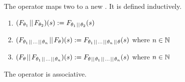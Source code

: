 \documentclass[preview]{standalone}
\begin{document}
%	
\begin{definition}
	The operator \pll maps two \grpfctsN to a new \grpfctN. It is defined inductively.
	\begin{enumerate}
		\item $(\grpfct[\viewppty_1] \pll \grpfct[\viewppty_2])(\state) := \grpfct[{\viewppty_1 \pll \viewppty_2}](\state)$
		\item $(\grpfct[{\viewppty_1 \pll \dots \pll \viewppty_n}] \pll \grpfct)(\state) := \grpfct[{\viewppty_1 \pll \dots \pll \viewppty_n \pll \viewppty}](\state)$ \quad where $n \in \natnums$
		\item $(\grpfct \pll \grpfct[{\viewppty_1 \pll \dots \pll \viewppty_n}])(\state) := \grpfct[{\viewppty \pll \viewppty_1 \pll \dots \pll \viewppty_n}](\state)$ \quad where $n \in \natnums$
	\end{enumerate}
	
\end{definition}

\begin{proposition}
	The operator \pll is associative.
\end{proposition}
\end{document}
